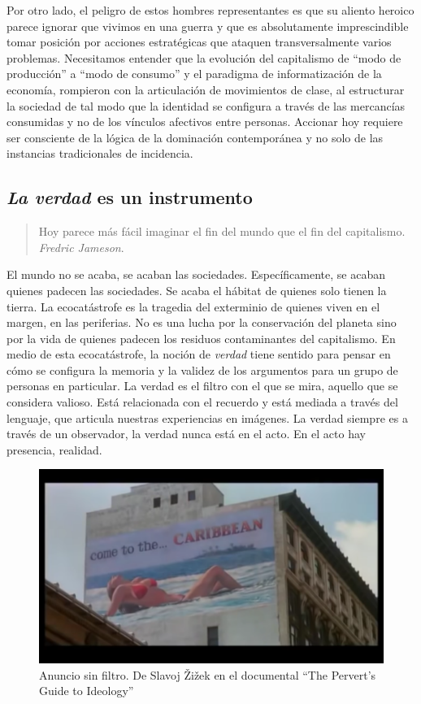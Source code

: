 Por otro lado, el peligro de estos hombres representantes es que su aliento heroico parece ignorar que vivimos en una guerra y que es absolutamente imprescindible tomar posición por acciones estratégicas que ataquen transversalmente varios problemas. Necesitamos entender que la evolución del capitalismo de \enquote{modo de producción}\revquotes{} a \enquote{modo de consumo}\revquotes{} y el paradigma de informatización de la economía, rompieron con la articulación de movimientos de clase, al estructurar la sociedad de tal modo que la identidad se configura a través de las mercancías consumidas y no de los vínculos afectivos entre personas. Accionar hoy requiere ser consciente de la lógica de la dominación contemporánea y no solo de las instancias tradicionales de incidencia.

\subsection{\emph{La verdad} es un instrumento}
\label{sub:verdadinstrumental}

\begin{quote}
	Hoy parece más fácil imaginar el fin del mundo que el fin del
	capitalismo.\\ \emph{Fredric Jameson}.
\end{quote}

El mundo no se acaba, se acaban las sociedades. Específicamente, se acaban quienes padecen las sociedades. Se acaba el hábitat de quienes solo tienen la tierra. La ecocatástrofe es la tragedia del exterminio de quienes viven en el margen, en las periferias. No es una lucha por la conservación del planeta sino por la vida de quienes padecen los residuos contaminantes del capitalismo. En medio de esta ecocatástrofe, la noción de \emph{verdad} tiene sentido para pensar en cómo se configura la memoria y la validez de los argumentos para un grupo de personas en particular. La verdad es el filtro con el que se mira, aquello que se considera valioso. Está relacionada con el recuerdo y está mediada a través del lenguaje, que articula nuestras experiencias en imágenes. La verdad siempre es a través de un observador, la verdad nunca está en el acto. En el acto hay presencia, realidad.

\begin{figure}[htbp]
	\centering
	\includegraphics[width=.9\linewidth]{images/ideology1.png}
	\caption[Anuncio sin filtro.]{Anuncio sin filtro. De Slavoj Žižek en el documental \enquote{The Pervert's Guide to Ideology}}
\end{figure}

